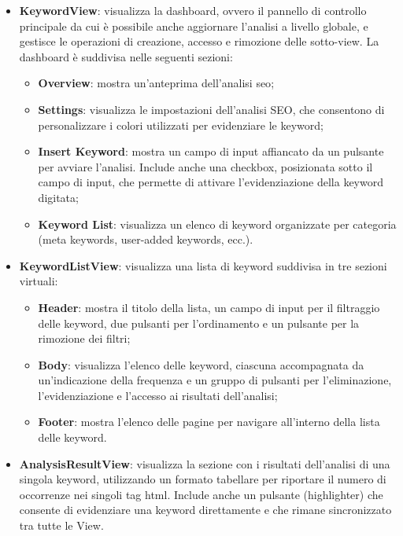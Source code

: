 \begin{itemize}
  \item \textbf{KeywordView}: visualizza la dashboard, ovvero il pannello di controllo principale da cui è possibile anche aggiornare l’analisi a livello globale, e gestisce le operazioni di creazione, accesso e rimozione delle sotto-view. La dashboard è suddivisa nelle seguenti sezioni:
  \begin{itemize}
    \item \textbf{Overview}: mostra un’anteprima dell’analisi \gls{seo};
    \item \textbf{Settings}: visualizza le impostazioni dell’analisi SEO, che consentono di personalizzare i colori utilizzati per evidenziare le keyword;
    \item \textbf{Insert Keyword}: mostra un campo di input affiancato da un pulsante per avviare l’analisi. Include anche una checkbox, posizionata sotto il campo di input, che permette di attivare l’evidenziazione della keyword digitata;
    \item \textbf{Keyword List}: visualizza un elenco di keyword organizzate per categoria (meta keywords, user-added keywords, ecc.).
  \end{itemize}
  \item \textbf{KeywordListView}: visualizza una lista di keyword suddivisa in tre sezioni virtuali:
  \begin{itemize}
    \item \textbf{Header}: mostra il titolo della lista, un campo di input per il filtraggio delle keyword, due pulsanti per l’ordinamento e un pulsante per la rimozione dei filtri;
    \item \textbf{Body}: visualizza l’elenco delle keyword, ciascuna accompagnata da un’indicazione della frequenza e un gruppo di pulsanti per l’eliminazione, l’evidenziazione e l’accesso ai risultati dell’analisi;
    \item \textbf{Footer}: mostra l’elenco delle pagine per navigare all’interno della lista delle keyword.
  \end{itemize}
  \item \textbf{AnalysisResultView}: visualizza la sezione con i risultati dell’analisi di una singola keyword, utilizzando un formato tabellare per riportare il numero di occorrenze nei singoli tag \gls{html}. Include anche un pulsante (highlighter) che consente di evidenziare una keyword direttamente e che rimane sincronizzato tra tutte le View.
\end{itemize}

